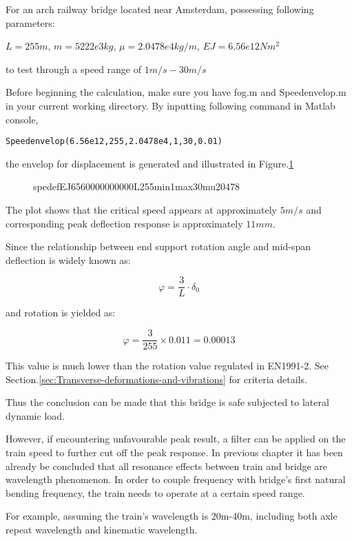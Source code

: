 For an arch railway bridge located near Amsterdam, possessing following parameters:

$L = 255m$, $m = 5222e3kg$, $\mu = 2.0478e4 kg/m$, $EJ = 6.56e12Nm^2$

to test through a speed range of $1m/s - 30m/s$

Before beginning the calculation, make sure you have fog.m and Speedenvelop.m in your current working directory. By inputting following command in Matlab console, 

\texttt{Speedenvelop(6.56e12,255,2.0478e4,1,30,0.01)}


the envelop for displacement is generated and illustrated in Figure.\ref{fig:spedefEJ6560000000000L255min1max30mu20478.tikz}

\begin{figure}[h!]
\centering 
\setlength\figureheight{6cm} 
\setlength\figurewidth{6cm} 
 
\caption{spedefEJ6560000000000L255min1max30mu20478} 
\label{fig:spedefEJ6560000000000L255min1max30mu20478.tikz} 
\end{figure}

The plot shows that the critical speed appears at approximately $5m/s$ and corresponding peak deflection response is approximately $11mm$. 

Since the relationship between end support rotation angle and mid-span deflection is widely known as:

$$ \varphi = \frac{3}{L}\cdot \delta_0  $$

and rotation is yielded as:

$$ \varphi = \frac{3}{255}\times 0.011 = 0.00013 $$

This value is much lower than the rotation value regulated in EN1991-2. See Section.\ref{sec:Transverse-deformations-and-vibrations} for criteria details.

Thus the conclusion can be made that this bridge is safe subjected to lateral dynamic load.

However, if encountering unfavourable peak result, a filter can be applied on the train speed to further cut off the peak response. In previous chapter it has been already be concluded that all resonance effects between train and bridge are wavelength phenomenon. In order to couple frequency with bridge's first natural bending frequency, the train needs to operate at a certain speed range. 

For example, assuming the train's wavelength is 20m-40m, including both axle repeat wavelength and kinematic wavelength. 

